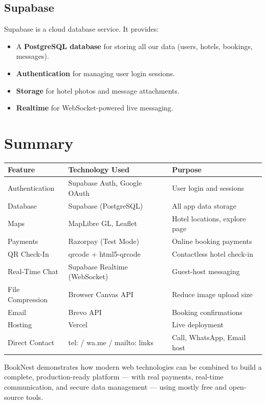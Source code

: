 \documentclass[12pt,a4paper]{article}
\begin{document}
\subsection{Supabase}
Supabase is a cloud database service. It provides:
\begin{itemize}
  \item A \textbf{PostgreSQL database} for storing all our data (users, hotels, bookings, messages).
  \item \textbf{Authentication} for managing user login sessions.
  \item \textbf{Storage} for hotel photos and message attachments.
  \item \textbf{Realtime} for WebSocket-powered live messaging.
\end{itemize}

\newpage
\section{Summary}

\begin{center}
\begin{tabular}{@{}lll@{}}
\toprule
\textbf{Feature} & \textbf{Technology Used} & \textbf{Purpose} \\
\midrule
Authentication & Supabase Auth, Google OAuth & User login and sessions \\
Database & Supabase (PostgreSQL) & All app data storage \\
Maps & MapLibre GL, Leaflet & Hotel locations, explore page \\
Payments & Razorpay (Test Mode) & Online booking payments \\
QR Check-In & qrcode + html5-qrcode & Contactless hotel check-in \\
Real-Time Chat & Supabase Realtime (WebSocket) & Guest-host messaging \\
File Compression & Browser Canvas API & Reduce image upload size \\
Email & Brevo API & Booking confirmations \\
Hosting & Vercel & Live deployment \\
Direct Contact & tel: / wa.me / mailto: links & Call, WhatsApp, Email host \\
\bottomrule
\end{tabular}
\end{center}

\vspace{1cm}

BookNest demonstrates how modern web technologies can be combined to build a complete, production-ready platform --- with real payments, real-time communication, and secure data management --- using mostly free and open-source tools.
\end{document}
